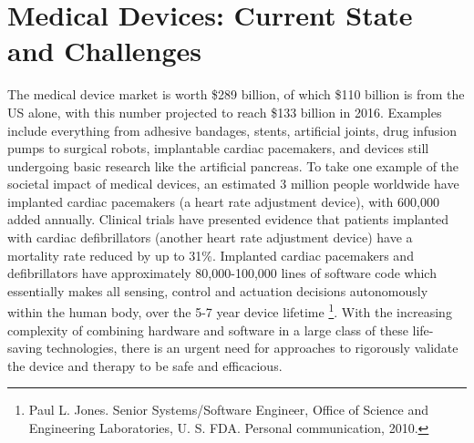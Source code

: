 \chapter{Medical Devices: Current State and Challenges}

The medical device market is worth \$289 billion, of which \$110 billion is from the US alone, with this number projected to reach \$133 billion in 2016.
Examples include everything from adhesive bandages, stents, artificial joints, drug infusion pumps to surgical robots, implantable cardiac pacemakers, and devices still undergoing basic research like the artificial pancreas.
To take one example of the societal impact of medical devices, an estimated 3 million people worldwide have implanted cardiac pacemakers (a heart rate adjustment device), with 600,000 added annually.
Clinical trials have presented evidence that patients implanted with cardiac defibrillators (another heart rate adjustment device) have a mortality rate reduced by up to 31\%.
Implanted cardiac pacemakers and defibrillators have approximately 80,000-100,000 lines of software code which essentially makes all sensing, control and actuation decisions autonomously within the human body, over the 5-7 year device lifetime \footnote{Paul L. Jones. Senior Systems/Software Engineer, Office of Science and Engineering
Laboratories, U. S. FDA. Personal communication, 2010.}. With the increasing complexity of combining hardware and software in a large class of these life-saving technologies, there is an urgent need for approaches to rigorously validate the device and therapy to be safe and efficacious.
